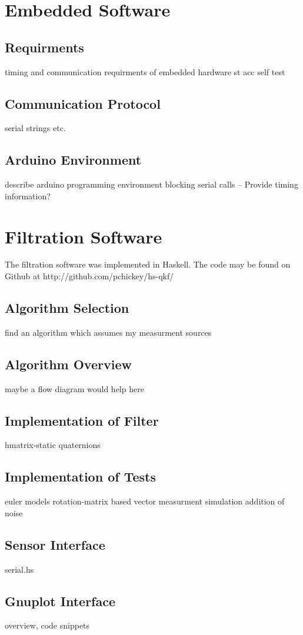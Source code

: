 \documentclass[12pt]{report}
\begin{document}
\section{Embedded Software}
\subsection{Requirments}
timing and communication requirments of embedded hardware
st acc self test
\subsection{Communication Protocol}
serial strings etc.
\subsection{Arduino Environment}
describe arduino programming environment
blocking serial calls
-- Provide timing information?

\section{Filtration Software}
The filtration software was implemented in Haskell. The code may be found on Github at http://github.com/pchickey/hs-qkf/
\subsection{Algorithm Selection}
find an algorithm which assumes my measurment sources
\subsection{Algorithm Overview}
maybe a flow diagram would help here
\subsection{Implementation of Filter}
hmatrix-static
quaternions
\subsection{Implementation of Tests}
euler models
rotation-matrix based vector measurment simulation
addition of noise
\subsection{Sensor Interface}
serial.hs
\subsection{Gnuplot Interface}
overview, code snippets
\end{document}
